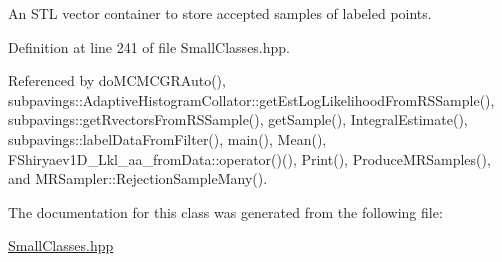 \-An \-S\-T\-L vector container to store accepted samples of labeled points. 



\-Definition at line 241 of file \-Small\-Classes.\-hpp.



\-Referenced by do\-M\-C\-M\-C\-G\-R\-Auto(), subpavings\-::\-Adaptive\-Histogram\-Collator\-::get\-Est\-Log\-Likelihood\-From\-R\-S\-Sample(), subpavings\-::get\-Rvectors\-From\-R\-S\-Sample(), get\-Sample(), \-Integral\-Estimate(), subpavings\-::label\-Data\-From\-Filter(), main(), \-Mean(), \-F\-Shiryaev1\-D\-\_\-\-Lkl\-\_\-aa\-\_\-from\-Data\-::operator()(), \-Print(), \-Produce\-M\-R\-Samples(), and \-M\-R\-Sampler\-::\-Rejection\-Sample\-Many().



\-The documentation for this class was generated from the following file\-:\begin{DoxyCompactItemize}
\item 
\hyperlink{SmallClasses_8hpp}{\-Small\-Classes.\-hpp}\end{DoxyCompactItemize}
